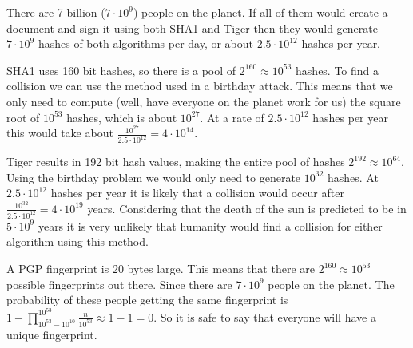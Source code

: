 There are 7 billion ($7 \cdot 10^9$) people on the planet. If all of them would create a document and sign it using both SHA1 and Tiger then they would generate $7 \cdot 10^9$ hashes of both algorithms per day, or about $2.5 \cdot 10^{12}$ hashes per year.

SHA1 uses 160 bit hashes, so there is a pool of $2^{160} \approx 10^{53}$ hashes. To find a collision we can use the method used in a birthday attack. This means that we only need to compute (well, have everyone on the planet work for us) the square root of $10^{53}$ hashes, which is about $10^{27}$. At a rate of $2.5 \cdot 10^{12}$ hashes per year this would take about $\displaystyle \frac{10^{27}}{2.5 \cdot 10^{12}} = 4 \cdot 10^{14}$.

Tiger results in 192 bit hash values, making the entire pool of hashes $2^{192} \approx 10^{64}$. Using the birthday problem we would only need to generate $10^{32}$ hashes. At $2.5 \cdot 10^{12}$ hashes per year it is likely that a collision would occur after $\displaystyle \frac{10^{32}}{2.5 \cdot 10^{12}} = 4 \cdot 10^{19}$ years. Considering that the death of the sun is predicted to be in $5 \cdot 10^{9}$ years it is very unlikely that humanity would find a collision for either algorithm using this method.

A PGP fingerprint is 20 bytes large. This means that there are $2^{160} \approx 10^{53}$ possible fingerprints out there. Since there are $7 \cdot 10^9$ people on the planet. The probability of these people getting the same fingerprint is $\displaystyle 1 - \prod\limits_{10^{53}-10^{10}}^{10^{53}} \frac{n}{10^{53}} \approx 1 - 1 = 0$. So it is safe to say that everyone will have a unique fingerprint.
